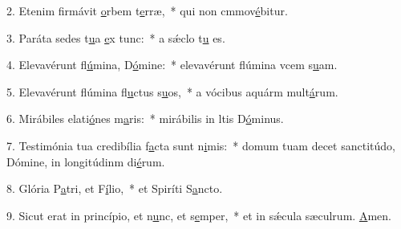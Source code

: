 2. Etenim firmávit \uline{o}rbem t\uline{e}rræ,~* qui non cmmov\uline{é}bitur.\par 
3. Paráta sedes t\uline{u}a \uline{e}x tunc:~* a sǽclo t\uline{u} es.\par 
4. Elevavérunt fl\uline{ú}mina, D\uline{ó}mine:~* elevavérunt flúmina vcem s\uline{u}am.\par 
5. Elevavérunt flúmina fl\uline{u}ctus s\uline{u}os,~* a vócibus aquárm mult\uline{á}rum.\par 
6. Mirábiles elati\uline{ó}nes m\uline{a}ris:~* mirábilis in ltis D\uline{ó}minus.\par 
7. Testimónia tua credibília f\uline{a}cta sunt n\uline{i}mis:~* domum tuam decet sanctitúdo, Dómine, in longitúdinm di\uline{é}rum.\par 
8. Glória P\uline{a}tri, et F\uline{í}lio,~* et Spiríti S\uline{a}ncto.\par 
9. Sicut erat in princípio, et n\uline{u}nc, et s\uline{e}mper,~* et in sǽcula sæculrum. \uline{A}men.\par 
